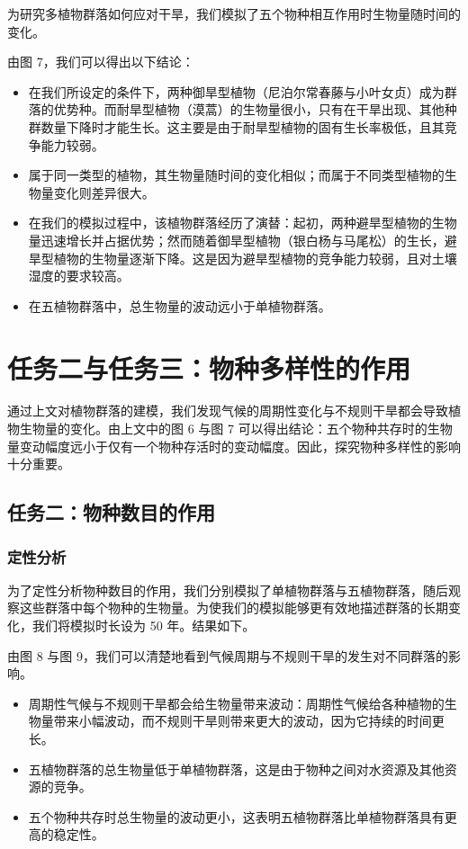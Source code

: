 \documentclass[11pt,a4paper]{ctexart}
\begin{document}
为研究多植物群落如何应对干旱，我们模拟了五个物种相互作用时生物量随时间的变化。

由图 7，我们可以得出以下结论：

\begin{itemize}
\item 在我们所设定的条件下，两种御旱型植物（尼泊尔常春藤与小叶女贞）成为群落的优势种。而耐旱型植物（漠蒿）的生物量很小，只有在干旱出现、其他种群数量下降时才能生长。这主要是由于耐旱型植物的固有生长率极低，且其竞争能力较弱。
\item 属于同一类型的植物，其生物量随时间的变化相似；而属于不同类型植物的生物量变化则差异很大。
\item 在我们的模拟过程中，该植物群落经历了演替：起初，两种避旱型植物的生物量迅速增长并占据优势；然而随着御旱型植物（银白杨与马尾松）的生长，避旱型植物的生物量逐渐下降。这是因为避旱型植物的竞争能力较弱，且对土壤湿度的要求较高。
\item 在五植物群落中，总生物量的波动远小于单植物群落。
\end{itemize}
\section{任务二与任务三：物种多样性的作用}

通过上文对植物群落的建模，我们发现气候的周期性变化与不规则干旱都会导致植物生物量的变化。由上文中的图 6 与图 7 可以得出结论：五个物种共存时的生物量变动幅度远小于仅有一个物种存活时的变动幅度。因此，探究物种多样性的影响十分重要。

\subsection{任务二：物种数目的作用}

\subsubsection{定性分析}

为了定性分析物种数目的作用，我们分别模拟了单植物群落与五植物群落，随后观察这些群落中每个物种的生物量。为使我们的模拟能够更有效地描述群落的长期变化，我们将模拟时长设为 50 年。结果如下。

由图 8 与图 9，我们可以清楚地看到气候周期与不规则干旱的发生对不同群落的影响。

\begin{itemize}
\item 周期性气候与不规则干旱都会给生物量带来波动：周期性气候给各种植物的生物量带来小幅波动，而不规则干旱则带来更大的波动，因为它持续的时间更长。
\item 五植物群落的总生物量低于单植物群落，这是由于物种之间对水资源及其他资源的竞争。
\item 五个物种共存时总生物量的波动更小，这表明五植物群落比单植物群落具有更高的稳定性。
\end{itemize}
\end{document}
